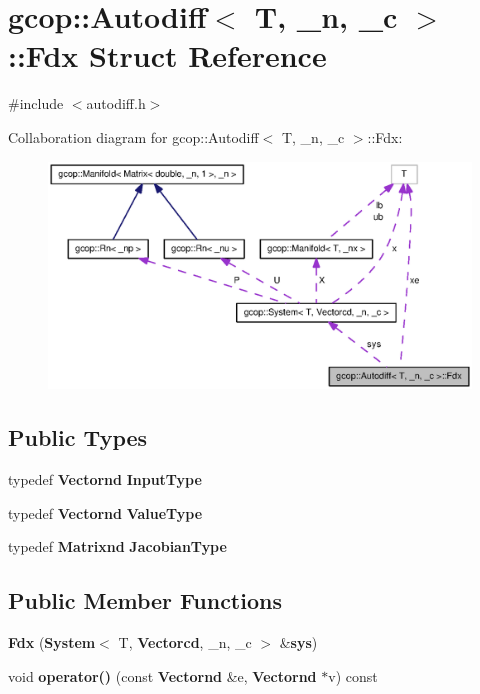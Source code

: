 \section{gcop\-:\-:\-Autodiff$<$ \-T, \-\_\-n, \-\_\-c $>$\-:\-:\-Fdx \-Struct \-Reference}
\label{structgcop_1_1Autodiff_1_1Fdx}


{\ttfamily \#include $<$autodiff.\-h$>$}



\-Collaboration diagram for gcop\-:\-:\-Autodiff$<$ \-T, \-\_\-n, \-\_\-c $>$\-:\-:\-Fdx\-:
\nopagebreak
\begin{figure}[H]
\begin{center}
\leavevmode
\includegraphics[width=350pt]{structgcop_1_1Autodiff_1_1Fdx__coll__graph}
\end{center}
\end{figure}
\subsection*{\-Public \-Types}
\begin{DoxyCompactItemize}
\item 
typedef {\bf \-Vectornd} {\bf \-Input\-Type}
\item 
typedef {\bf \-Vectornd} {\bf \-Value\-Type}
\item 
typedef {\bf \-Matrixnd} {\bf \-Jacobian\-Type}
\end{DoxyCompactItemize}
\subsection*{\-Public \-Member \-Functions}
\begin{DoxyCompactItemize}
\item 
{\bf \-Fdx} ({\bf \-System}$<$ \-T, {\bf \-Vectorcd}, \-\_\-n, \-\_\-c $>$ \&{\bf sys})
\item 
void {\bf operator()} (const {\bf \-Vectornd} \&e, {\bf \-Vectornd} $\ast$v) const 
\end{DoxyCompactItemize}

